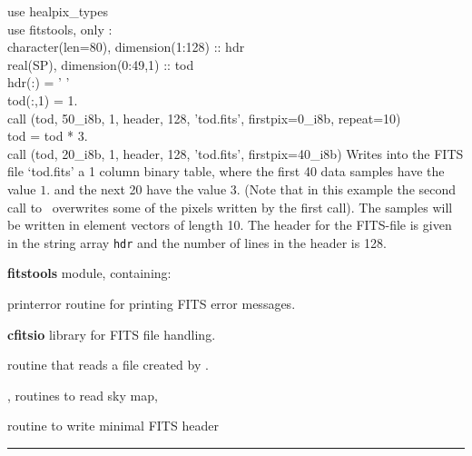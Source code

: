 \begin{example}
{
use healpix\_types \\
use fitstools, only : \thedocid \\
character(len=80), dimension(1:128) :: hdr \\
real(SP), dimension(0:49,1) :: tod \\
hdr(:) = ' ' \\
tod(:,1) = 1. \\
call \thedocid (tod, 50\_i8b, 1, header, 128, 'tod.fits', firstpix=0\_i8b, repeat=10)  \\
tod = tod * 3. \\
call \thedocid (tod, 20\_i8b, 1, header, 128, 'tod.fits', firstpix=40\_i8b)  
}
{
Writes into the FITS file `tod.fits' a 1 column binary table, where the first 40
data samples have the value $1.$ and the next 20 have the value $3.$ (Note that
in this example the
second call to \thedocid \ overwrites some of the pixels written by the first call). The samples will be
written in element vectors of length 10. The header for the FITS-file is given in the
string array {\tt hdr} and the number of lines in the header is 128. 
}
\end{example}

\begin{modules}
  \begin{sulist}{} %
  \item[\textbf{fitstools}] module, containing:
  \item[printerror] routine for printing FITS error messages.
  \item[\textbf{cfitsio}] library for FITS file handling.		
  \end{sulist}
\end{modules}

\begin{related}
  \begin{sulist}{} %
  \item[\htmlref{input\_tod*}{sub:input_tod}] routine that reads a file created by \thedocid. 
  \item[\htmlref{input\_map}{sub:input_map},
  \htmlref{read\_bintab}{sub:read_bintab}] routines to read \healpix sky map,
  \item[\htmlref{write\_minimal\_header}{sub:write_minimal_header}] routine to write minimal FITS header
  \end{sulist}
\end{related}

\rule{\hsize}{2mm}

\newpage
